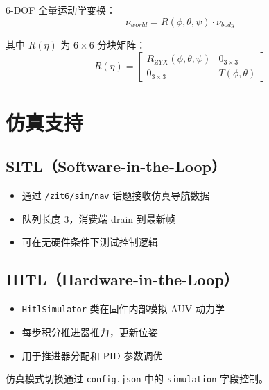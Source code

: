 \documentclass[12pt,a4paper]{article}
\begin{document}
6-DOF 全量运动学变换：
\begin{equation}
\nu_{world} = R(\phi, \theta, \psi) \cdot \nu_{body}
\end{equation}

其中 $R(\eta)$ 为 $6\times6$ 分块矩阵：
\begin{equation}
R(\eta) = \begin{bmatrix}
R_{ZYX}(\phi,\theta,\psi) & 0_{3\times3} \\
0_{3\times3} & T(\phi,\theta)
\end{bmatrix}
\end{equation}

\section{仿真支持}

\subsection{SITL（Software-in-the-Loop）}
\begin{itemize}
    \item 通过 \texttt{/zit6/sim/nav} 话题接收仿真导航数据
    \item 队列长度 3，消费端 drain 到最新帧
    \item 可在无硬件条件下测试控制逻辑
\end{itemize}

\subsection{HITL（Hardware-in-the-Loop）}
\begin{itemize}
    \item \texttt{HitlSimulator} 类在固件内部模拟 AUV 动力学
    \item 每步积分推进器推力，更新位姿
    \item 用于推进器分配和 PID 参数调优
\end{itemize}

仿真模式切换通过 \texttt{config.json} 中的 \texttt{simulation} 字段控制。
\end{document}
